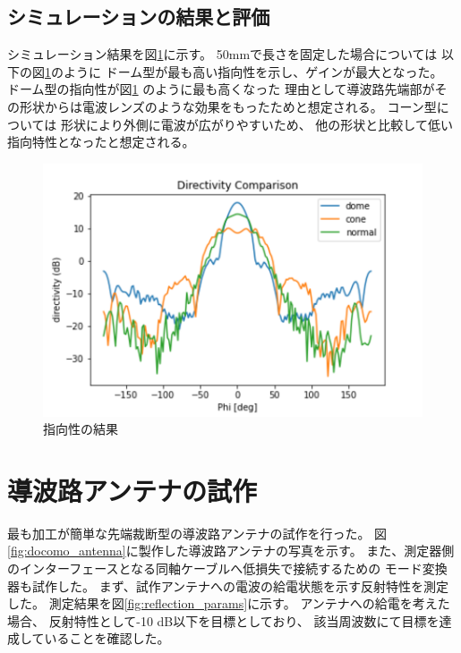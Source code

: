 \documentclass[technicalreport]{ieicej}
\begin{document}
\subsection{シミュレーションの結果と評価}

シミュレーション結果を図\ref{fig:directivity_results}に示す。
50mmで長さを固定した場合については
以下の図\ref{fig:directivity_results}のように
ドーム型が最も高い指向性を示し、ゲインが最大となった。
ドーム型の指向性が図\ref{fig:directivity_results} のように最も高くなった
理由として導波路先端部がその形状からは電波レンズのような効果をもったためと想定される。
コーン型については
形状により外側に電波が広がりやすいため、
他の形状と比較して低い指向特性となったと想定される。

\begin{figure}[tb]
  \begin{center}
    \includegraphics[bb=0.000000 0.000000 432.098422 288.065615, width=1.0\linewidth]{img/directivity_comparison.pdf}
    \caption{指向性の結果}
    \label{fig:directivity_results}
  \end{center}
\end{figure}

\section{導波路アンテナの試作}

最も加工が簡単な先端裁断型の導波路アンテナの試作を行った。
図\ref{fig:docomo_antenna}に製作した導波路アンテナの写真を示す。
また、測定器側のインターフェースとなる同軸ケーブルへ低損失で接続するための
モード変換器も試作した。
まず、試作アンテナへの電波の給電状態を示す反射特性を測定した。
測定結果を図\ref{fig:reflection_params}に示す。
アンテナへの給電を考えた場合、
反射特性として-10 dB以下を目標としており、
該当周波数にて目標を達成していることを確認した。
\end{document}
